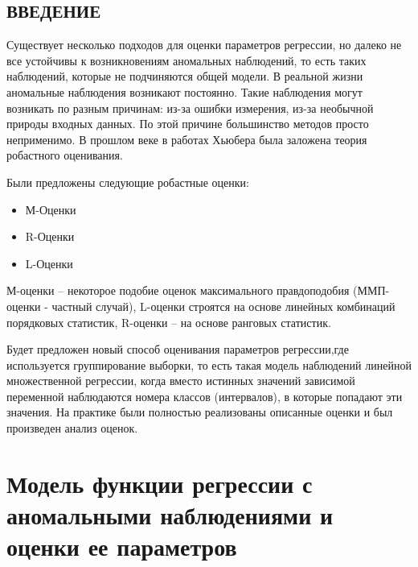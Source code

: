\documentclass[a4paper,14pt]{extarticle}
\begin{document}
\newpage
\thispagestyle{empty}
\addtocounter{page}{-1}
\mbox{}
\newpage

\tableofcontents
\newpage
\begin{center}
    \section*{ВВЕДЕНИЕ}
\end{center}
{}
Существует несколько подходов для оценки параметров регрессии, но далеко не все устойчивы к возникновениям аномальных наблюдений, 
то есть таких наблюдений, которые не подчиняются общей модели. 
В реальной жизни аномальные наблюдения возникают постоянно. 
Такие наблюдения могут возникать по разным причинам: из-за ошибки измерения, из-за необычной природы входных данных.
По этой причине большинство методов просто неприменимо.
В прошлом веке в работах Хьюбера была заложена теория робастного оценивания.

Были предложены следующие робастные оценки\cite{Huber}:
\begin{itemize}
    \item М-Оценки
    \item R-Оценки
    \item L-Оценки
\end{itemize}
М-оценки -- некоторое подобие оценок максимального правдоподобия (ММП-оценки - частный случай), L-оценки строятся на основе линейных комбинаций порядковых статистик, R-оценки -- на основе ранговых статистик.

Будет предложен новый способ оценивания параметров регрессии,где используется группирование выборки, 
то есть такая модель наблюдений линейной  множественной  регрессии,  когда  вместо  истинных  значений
зависимой переменной наблюдаются номера классов (интервалов), в которые
попадают эти значения\cite{OLSforGrouping}. На практике были полностью реализованы описанные оценки и был произведен анализ оценок. 


\newpage
\section{Модель функции регрессии с аномальными наблюдениями и оценки ее параметров}
\end{document}
